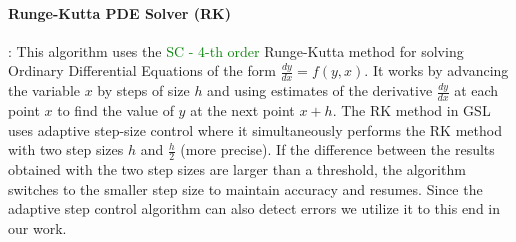 \documentclass{sig-alternate}
\newcommand{\sui}[1]{%
  \textcolor{green}{SC - #1}
}
\begin{document}
\paragraph{Runge-Kutta PDE Solver (RK)}:
This algorithm uses the \sui{4-th order} Runge-Kutta method for solving Ordinary Differential Equations of the form $\frac{dy}{dx} = f(y, x)$.
It works by advancing the variable $x$ by steps of size $h$ and using estimates of the derivative $\frac{dy}{dx}$ at each point $x$ to find the value of $y$ at the next point $x+h$.
The RK method in GSL uses adaptive step-size control where it simultaneously performs the RK method with two step sizes $h$ and $\frac{h}{2}$ (more precise).
If the difference between the results obtained with the two step sizes are larger than a threshold, the algorithm switches to the smaller step size to maintain accuracy and resumes.
Since the adaptive step control algorithm can also detect errors we utilize it to this end in our work.
\end{document}
